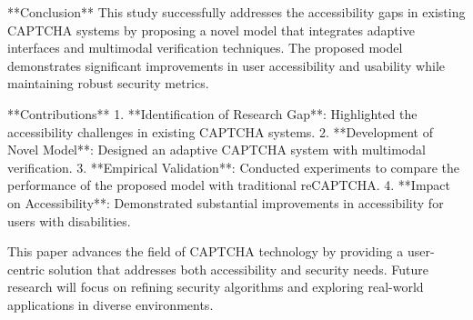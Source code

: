 **Conclusion**  
This study successfully addresses the accessibility gaps in existing CAPTCHA systems by proposing a novel model that integrates adaptive interfaces and multimodal verification techniques. The proposed model demonstrates significant improvements in user accessibility and usability while maintaining robust security metrics.  

**Contributions**  
1. **Identification of Research Gap**: Highlighted the accessibility challenges in existing CAPTCHA systems.  
2. **Development of Novel Model**: Designed an adaptive CAPTCHA system with multimodal verification.  
3. **Empirical Validation**: Conducted experiments to compare the performance of the proposed model with traditional reCAPTCHA.  
4. **Impact on Accessibility**: Demonstrated substantial improvements in accessibility for users with disabilities.  

This paper advances the field of CAPTCHA technology by providing a user-centric solution that addresses both accessibility and security needs. Future research will focus on refining security algorithms and exploring real-world applications in diverse environments.